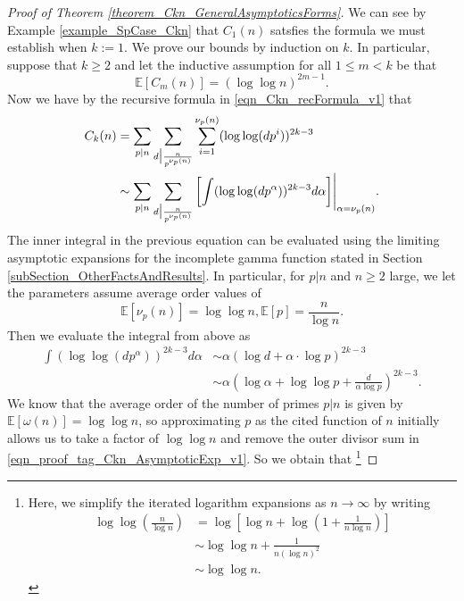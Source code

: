 \documentclass[11pt,reqno,a4letter]{article}
\numberwithin{figure}{section}
\numberwithin{table}{section}
\theoremstyle{plain}
\numberwithin{theorem}{section}
\theoremstyle{definition}
\newcommand{\NBRef}[1]{}
\begin{document}
\NBRef{A08-2020-04-26} 
\begin{proof}[Proof of Theorem \ref{theorem_Ckn_GeneralAsymptoticsForms}] 
\label{proofOf_theorem_Ckn_GeneralAsymptoticsForms} 
We can see by Example \ref{example_SpCase_Ckn} that $C_1(n)$ 
satsfies the formula we must establish when $k := 1$. 
We prove our bounds by induction on $k$. 
In particular, suppose that $k \geq 2$ and let the inductive assumption for all $1 \leq m < k$ 
be that 
\[
\mathbb{E}[C_m(n)] = (\log\log n)^{2m-1}. 
\]
Now we have by the recursive formula in \eqref{eqn_Ckn_recFormula_v1} that 
\begin{align} 
\notag 
C_k(n) & = \sum_{p|n} \sum_{d\bigr\rvert\frac{n}{p^{\nu_p(n)}}} \sum_{i=1}^{\nu_p(n)} (\log\log(dp^i))^{2k-3} \\ 
\label{eqn_proof_tag_Ckn_AsymptoticExp_v1} 
     & \sim \sum_{p|n} \sum_{d\bigr\rvert\frac{n}{p^{\nu_p(n)}}} \left[ 
     \int (\log\log(dp^{\alpha}))^{2k-3} d\alpha\right] \Biggr\rvert_{\alpha=\nu_p(n)}. 
\end{align} 
The inner integral in the previous equation can be evaluated using the 
limiting asymptotic expansions for the incomplete gamma function stated in 
Section \ref{subSection_OtherFactsAndResults}. 
In particular, for $p|n$ and $n \geq 2$ large, we let the parameters assume average order values of 
\[
\mathbb{E}[\nu_p(n)] = \log\log n, \mathbb{E}[p] = \frac{n}{\log n}. 
\]
Then we evaluate the integral from above as 
\begin{align*} 
\int (\log\log(dp^{\alpha}))^{2k-3} d\alpha & \sim \alpha \left( 
     \log d + \alpha \cdot \log p\right)^{2k-3} \\ 
     & \sim \alpha \left(\log \alpha + \log\log p + \frac{d}{\alpha \log p}\right)^{2k-3}. 
\end{align*} 
We know that the average order of the number of primes $p|n$ is given by 
$\mathbb{E}[\omega(n)] = \log\log n$, so approximating $p$ as the cited function of $n$ initially 
allows us to take a factor of $\log\log n$ and remove the outer divisor sum in 
\eqref{eqn_proof_tag_Ckn_AsymptoticExp_v1}. So we obtain that \footnote{ 
     Here, we simplify the iterated logarithm expansions as $n \rightarrow \infty$ by writing 
     \begin{align*} 
     \log\log\left(\frac{n}{\log n}\right) & = \log\left[\log n + \log\left(1 + \frac{1}{n\log n}\right)\right] \\ 
          & \sim \log\log n + \frac{1}{n (\log n)^2} \\ 
          & \sim \log\log n. 

\end{align*}}
\end{proof}
\end{document}
